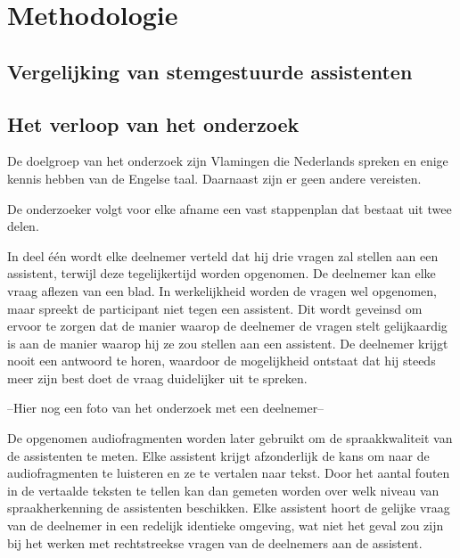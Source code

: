 
\chapter{Methodologie}
\label{ch:methodologie}

\section{Vergelijking van stemgestuurde assistenten}
\label{sec:vergelijking van stemgestuurde assistenten}

\section{Het verloop van het onderzoek}
De doelgroep van het onderzoek zijn Vlamingen die Nederlands spreken en enige kennis hebben van de Engelse taal. Daarnaast zijn er geen andere vereisten.

De onderzoeker volgt voor elke afname een vast stappenplan dat bestaat uit twee delen.

In deel één wordt elke deelnemer verteld dat hij drie vragen zal stellen aan een assistent, terwijl deze tegelijkertijd worden opgenomen. De deelnemer kan elke vraag aflezen van een blad. In werkelijkheid worden de vragen wel opgenomen, maar spreekt de participant niet tegen een assistent. Dit wordt geveinsd om ervoor te zorgen dat de manier waarop de deelnemer de vragen stelt gelijkaardig is aan de manier waarop hij ze zou stellen aan een assistent. De deelnemer krijgt nooit een antwoord te horen, waardoor de mogelijkheid ontstaat dat hij steeds meer zijn best doet de vraag duidelijker uit te spreken.

--Hier nog een foto van het onderzoek met een deelnemer--

De opgenomen audiofragmenten worden later gebruikt om de spraakkwaliteit van de assistenten te meten. Elke assistent krijgt afzonderlijk de kans om naar de audiofragmenten te luisteren en ze te vertalen naar tekst. Door het aantal fouten in de vertaalde teksten te tellen kan dan gemeten worden over welk niveau van spraakherkenning de assistenten beschikken. Elke assistent hoort de gelijke vraag van de deelnemer in een redelijk identieke omgeving, wat niet het geval zou zijn bij het werken met rechtstreekse vragen van de deelnemers aan de assistent. 

